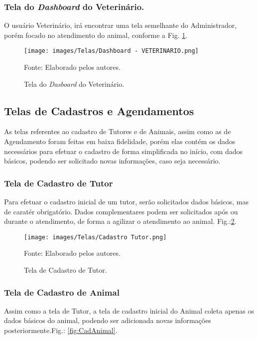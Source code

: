\documentclass[
    12pt,               %
    openright,          %
    oneside,
    a4paper,            %
    BIBLATEX,           %
    TODO,               %
    english,            %
    brazil              %
    ]{ifsp-spo-inf-ctds}
\begin{document}
    \subsubsection{Tela do \emph{Dashboard} do Veterinário.}
    O usuário Veterinário, irá encontrar uma tela semelhante do Administrador, porém focado no atendimento do animal, conforme a Fig. \ref{fig:DashVet}.

         \begin{figure}[H]
                \centering
                \caption{Tela do \emph{Dasboard} do Veterinário.}
                \texttt{[image: images/Telas/Dashboard - VETERINARIO.png]}

                \label{fig:DashVet}
                \centering
        {\footnotesize Fonte: Elaborado pelos autores.}
            \end{figure}    

    \subsection{Telas de Cadastros e Agendamentos}

As telas referentes ao cadastro de Tutores e de Animais, assim como as de Agendamento foram feitas em baixa fidelidade, porém elas contém os dados necessários para efetuar o cadastro de forma simplificada no início, com dados básicos, podendo ser solicitado novas informações, caso seja necessário.

\subsubsection{Tela de Cadastro de Tutor}
Para efetuar o cadastro inicial de um tutor, serão solicitados dados básicos, mas de caratér obrigatório. Dados complementares podem ser solicitados após ou durante o atendimento, de forma a agilizar o atendimento ao animal. Fig.:\ref{fig:CadTutor}.

\begin{figure}[H]
                \centering
                \caption{Tela de Cadastro de Tutor.}
                \texttt{[image: images/Telas/Cadastro Tutor.png]}

                \label{fig:CadTutor}
                \centering
        {\footnotesize Fonte: Elaborado pelos autores.}
            \end{figure}    


\subsubsection{Tela de Cadastro de Animal}
Assim como a tela de Tutor, a tela de cadastro inicial do Animal coleta apenas os dados básicos do animal, podendo ser adicionada novas informações posteriormente.Fig.: \ref{fig:CadAnimal}.
\end{document}
